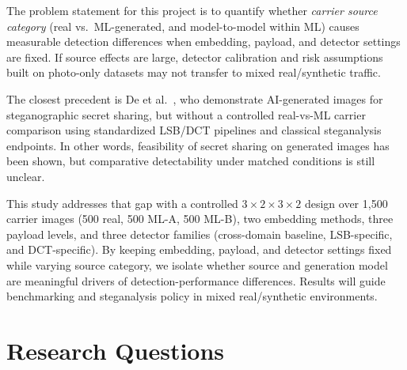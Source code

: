 \documentclass[10pt,twocolumn,a4paper]{article}
\begin{document}
The problem statement for this project is to quantify whether \emph{carrier source category} (real vs.\ ML-generated, and model-to-model within ML) causes measurable detection differences when embedding, payload, and detector settings are fixed. If source effects are large, detector calibration and risk assumptions built on photo-only datasets may not transfer to mixed real/synthetic traffic.

The closest precedent is De et al.~\cite{de2022ai}, who demonstrate AI-generated images for steganographic secret sharing, but without a controlled real-vs-ML carrier comparison using standardized LSB/DCT pipelines and classical steganalysis endpoints. In other words, feasibility of secret sharing on generated images has been shown, but comparative detectability under matched conditions is still unclear.

This study addresses that gap with a controlled $3\!\times\!2\!\times\!3\!\times\!2$ design over 1{,}500 carrier images (500 real, 500 ML-A, 500 ML-B), two embedding methods, three payload levels, and three detector families (cross-domain baseline, LSB-specific, and DCT-specific). By keeping embedding, payload, and detector settings fixed while varying source category, we isolate whether source and generation model are meaningful drivers of detection-performance differences. Results will guide benchmarking and steganalysis policy in mixed real/synthetic environments.

\section{Research Questions}
\end{document}
